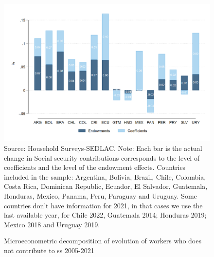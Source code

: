 \documentclass[english]{article}
\begin{document}
\begin{itemize}
\begin{figure}[!htb]
        \justifying
        \caption{Microeconometric decomposition of evolution of workers who does not contribute to ss 2005-2021}     
        \includegraphics[scale=.3]{latex/figures/Snapshot/Oaxaca decomposition level.png}
        \label{fig:Oaxaca_level}
        \footnotesize{Source: Household Surveys-SEDLAC.}
        \footnotesize{Note: Each bar is the actual change in Social security contributions corresponds to the level of coefficients and the level of the endowment effects. Countries included in the sample: Argentina, Bolivia, Brazil, Chile, Colombia, Costa Rica, Dominican Republic, Ecuador, El Salvador, Guatemala, Honduras, Mexico, Panama, Peru, Paraguay and Uruguay. Some countries don’t have information for 2021, in that cases we use the last available year, for Chile 2022, Guatemala 2014; Honduras 2019; Mexico 2018 and Uruguay 2019.}
        \end{figure}
\end{itemize}
\end{document}
